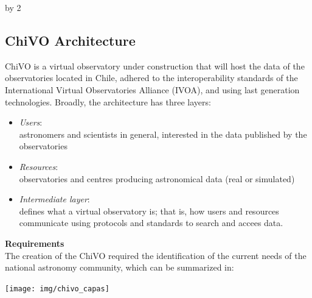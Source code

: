 \documentclass[11pt]{scrartcl}
\def\anzspalten{2}
\newlength{\kastenwidth}
\newenvironment{kasten}{
  \begin{lrbox}{\dummybox}
    \begin{minipage}{\linewidth}}
    {\end{minipage}
  \end{lrbox}
  \raisebox{-\depth}{\psshadowbox[cornersize=absolute,linearc=14pt,framesep=1em]{\usebox{\dummybox}}}\\[0.5em]}
\newenvironment{spalte}{
  \setlength\kastenwidth{1.2\textwidth}
  \divide\kastenwidth by \anzspalten
  \begin{minipage}[t]{\kastenwidth}}{\end{minipage}}
\begin{document}
\begin{lrbox}{\spalten}
{\begin{spalte}
\begin{kasten}
        \section*{\hspace{0.2cm} {\color{red} ChiVO Architecture} }
			\begin{minipage}{0.5\linewidth}
			ChiVO is a virtual observatory under construction
			that will host the data of the observatories located in Chile, adhered to the
			interoperability standards of the International Virtual Observatories Alliance
			(IVOA), and using last generation technologies.  
			Broadly, the architecture has three layers:
			\begin{itemize}
				\item \emph{Users}: \\astronomers and scientists in general, interested in the data published by the observatories
				\item \emph{Resources}: \\observatories and centres producing astronomical data (real or simulated)
				\item \emph{Intermediate layer}: \\defines what a virtual observatory is; that is, how users and resources communicate using protocols and standards to search and accees data.
			\end{itemize}
			\textbf{Requirements}\\\vspace{0.2cm}
			The creation of the ChiVO required the identification of the current needs of
			the national astronomy community, which can be summarized in:
			\end{minipage}
			\begin{minipage}{0.5\textwidth}
			\begin{center}
                        	\texttt{[image: img/chivo\_capas]}
			\end{center}
                        \end{minipage}


\end{kasten}
\end{spalte}}
\end{lrbox}
\end{document}
